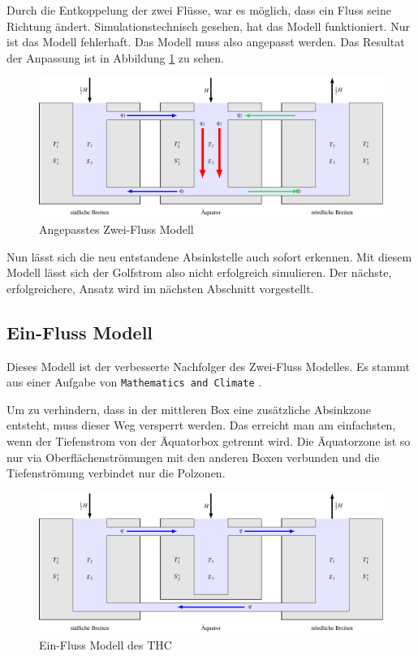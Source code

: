Durch die Entkoppelung der zwei Flüsse, war es möglich, dass ein Fluss seine Richtung ändert.
Simulationstechnisch gesehen, hat das Modell funktioniert. Nur ist das Modell fehlerhaft. Das Modell muss also angepasst werden. Das Resultat der Anpassung ist in Abbildung \ref{thermohalin:3b2f-inverted} zu sehen.

\begin{figure}
	\centering
	\includegraphics[width=14cm]{thermohalin/tikz/3b2f-inverted.pdf}
	\caption{Angepasstes Zwei-Fluss Modell}
	\label{thermohalin:3b2f-inverted}
\end{figure}

Nun lässt sich die neu entstandene Absinkstelle auch sofort erkennen. 
Mit diesem Modell lässt sich der Golfstrom also nicht erfolgreich simulieren. 
Der nächste, erfolgreichere, Ansatz wird im nächsten Abschnitt vorgestellt.

\subsection{Ein-Fluss Modell} 

Dieses Modell ist der verbesserte Nachfolger des Zwei-Fluss Modelles.
Es stammt aus einer Aufgabe von \texttt{Mathematics and Climate} \cite{skript:kaperengler}.

Um zu verhindern, dass in der mittleren Box eine zusätzliche Absinkzone entsteht, muss dieser Weg versperrt werden. Das erreicht man am einfachsten, wenn der Tiefenstrom von der Äquatorbox getrennt wird. Die Äquatorzone ist so nur via Oberflächenströmungen mit den anderen Boxen verbunden und die Tiefenströmung verbindet nur die Polzonen.


\begin{figure}
	\centering
	\includegraphics[width=14cm]{thermohalin/tikz/3b1f.pdf}
	\caption{Ein-Fluss Modell des THC}
	\label{thermohalin:3b1f}
\end{figure}

